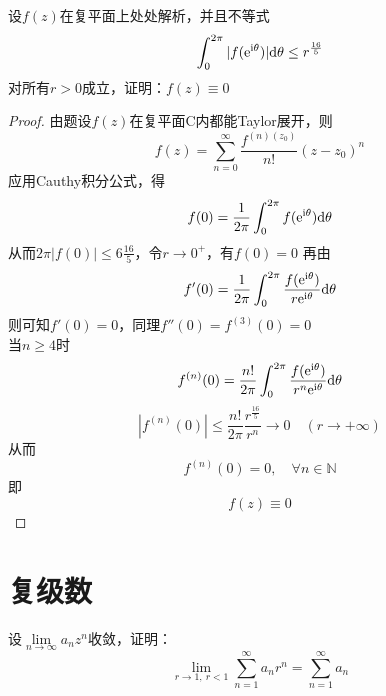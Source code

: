 \begin{proposition}

    设$f(z)$在复平面上处处解析，并且不等式
    $$\int_{0}^{2\pi}{|f(\mathrm{e^{\mathrm{i} \theta}})|}\mathrm{d} \theta \leq r^{\frac{16}{5}} $$
    对所有$r > 0$成立，证明：$f(z) \equiv 0$

\end{proposition}

\begin{proof}

    由题设$f(z)$在复平面$\mathrm{C}$内都能\textup{Taylor}展开，则
    $$f(z) = \sum_{n=0}^{\infty}{\dfrac{f^{(n)(z_0)}}{n!}(z - z_0)^n}$$
    应用\textup{Cauthy}积分公式，得
    $$f(0) = \dfrac{1}{2\pi} \int_{0}^{2\pi}{f(\mathrm{e}^{\mathrm{i} \theta})}\mathrm{d} \theta$$
    从而$2\pi|f(0)| \leq 6{\frac{16}{5}}$，令$r\to0^{+}$，有$f(0) = 0$
    再由
    $$f'(0) = \dfrac{1}{2\pi} \int_{0}^{2\pi}{\dfrac{f(\mathrm{e}^{\mathrm{i} \theta})}{r\mathrm{e}^{\mathrm{i} \theta}}}\mathrm{d} \theta$$
    则可知$f'(0) = 0$，同理$f''(0) = f^{(3)}(0) = 0$\\
    当$n \geq 4$时
    $$f^{(n)}(0) =  \dfrac{n!}{2\pi} \int_{0}^{2\pi}{\dfrac{f(\mathrm{e}^{\mathrm{i}\theta})}{r^n \mathrm{e}^{\mathrm{i}\theta}}}\mathrm{d} \theta$$
    $$|f^{(n)}(0)| \leq \dfrac{n!}{2\pi} \dfrac{r^{\frac{16}{5}}}{r^n} \to 0\quad(r\to+\infty)$$
    从而
    $$f^{(n)}(0) = 0,\quad \forall n \in \mathbb{N}$$
    即
    $$f(z) \equiv 0$$
    
\end{proof}

\section{复级数}

\begin{proposition}

    设$\lim\limits_{n\to\infty}{a_nz^n}$收敛，证明：
    $$\lim_{r \to 1,\ r < 1}{\sum\limits_{n=1}^{\infty}{a_nr^n}} = \sum_{n=1}^{\infty}{a_n}$$

\end{proposition}

